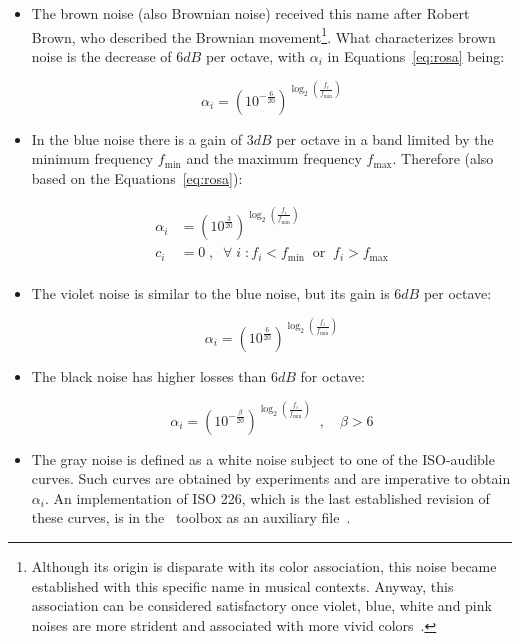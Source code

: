 \begin{itemize}
  \item The brown noise (also Brownian noise) received this name after Robert Brown, who described the Brownian movement\footnote{Although its origin is disparate with its color association, this noise became established with this specific name in musical contexts. Anyway, this association can be considered satisfactory once violet, blue, white and pink noises are more strident and associated with more vivid colors~\cite{Cook,guillaume}.}. What characterizes brown noise is the decrease of $6dB$ per octave, with $\alpha_i$ in Equations~\ref{eq:rosa} being:

\begin{equation}\label{eq:marrom}
 \alpha_i=(10^{-\frac{6}{20}})^{\log _2 \left( \frac{f_i}{f_{\text{min}}} \right )}
\end{equation}

 \item In the blue noise there is a gain of $3dB$ per octave in a band limited by the minimum frequency $f_{\text{min}}$ and the maximum frequency $f_{\text{max}}$. Therefore (also based on the Equations~\ref{eq:rosa}):

\begin{equation}\label{eq:azul}
 \begin{split}
 \alpha_i & = (10^{\frac{3}{20}})^{\log _2 \left ( \frac{f_i}{f_{\text{min}}} \right )} \\
 c_i & =0\;,\;\; \forall \; i \; : f_i<f_{\text{min}} \;\; \text{or} \;\; f_i>f_{\text{max}} \\
 \end{split}
\end{equation}

 \item The violet noise is similar to the blue noise, but its gain is $6dB$ per octave:

\begin{equation}\label{eq:violeta}
 \alpha_i = (10^{\frac{6}{20}})^{\log _2 \left ( \frac{f_i}{f_{\text{min}}} \right )}
\end{equation}

 \item The black noise has higher losses than $6dB$ for octave:

\begin{equation}\label{eq:preto}
 \alpha_i=(10^{-\frac{\beta}{20}})^{\log _2 \left( \frac{f_i}{f_{\text{min}}} \right )}\;\;, \quad \beta > 6
\end{equation}

 \item The gray noise is defined as a white noise subject to one of the ISO-audible curves. Such curves are obtained by experiments and are imperative to obtain $\alpha_i$. An implementation of ISO 226, which is the last established revision of these curves, is in the \massa\ toolbox as an auxiliary file~\cite{MASSA}.
\end{itemize}

